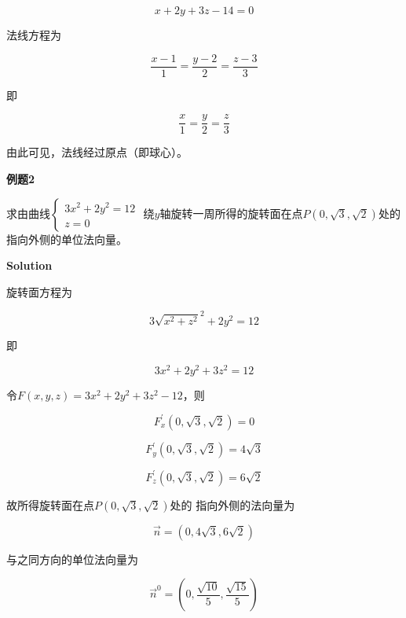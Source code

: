 \documentclass[12pt, a4paper]{article}
\numberwithin{equation}{section}
\begin{document}
    $$
        x+2 y+3 z-14=0
    $$

    法线方程为

    $$
        \frac{x-1}{1}=\frac{y-2}{2}=\frac{z-3}{3}
    $$

    即

    $$
        \frac{x}{1}=\frac{y}{2}=\frac{z}{3}
    $$

    由此可见，法线经过原点（即球心）。
    \vspace{1em}

    \textbf{例题2}

    求由曲线$\left\{\begin{array}{l}3 x^2+2 y^2=12 \\ z=0\end{array}\right.$
    绕\(y\)轴旋转一周所得的旋转面在点\(P\left(0,\sqrt{3},\sqrt{2}\right)\)处的
    指向外侧的单位法向量。
    \vspace{1em}

    \textbf{Solution}
    \vspace{1em}

    旋转面方程为

    \[
        3 \sqrt{x^2+z^2}^2+2 y^2 = 12
    \]

    即

    \[
        3 x^2+2 y^2 +3z^2= 12
    \]

    令\(F\left(x,y,z\right)=3 x^2+2 y^2 +3z^2 -12\)，则

    $$
        F_x^{\prime}(0, \sqrt{3}, \sqrt{2})=0
    $$

    $$
        F_y^{\prime}(0, \sqrt{3}, \sqrt{2})=4\sqrt{3}
    $$

    $$
        F_z^{\prime}(0, \sqrt{3}, \sqrt{2})=6\sqrt{2}
    $$

    故所得旋转面在点\(P\left(0,\sqrt{3},\sqrt{2}\right)\)处的
    指向外侧的法向量为

    \[
        \overrightarrow{n} = \left(0,4\sqrt{3},6\sqrt{2}\right)
    \]

    与之同方向的单位法向量为

    \[
        \overrightarrow{n}^0 = \left(0,\frac{\sqrt{10}}{5},\frac{\sqrt{15}}{5}\right)
    \]
\end{document}
